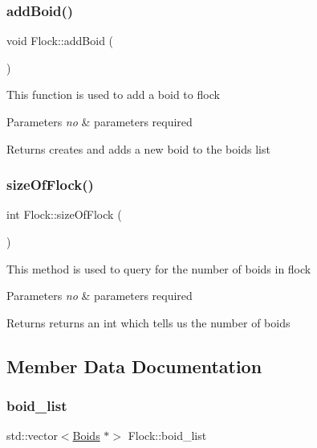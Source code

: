 \subsubsection{\texorpdfstring{add\+Boid()}{addBoid()}}
{\footnotesize\ttfamily void Flock\+::add\+Boid (\begin{DoxyParamCaption}{ }\end{DoxyParamCaption})}

This function is used to add a boid to flock 
\begin{DoxyParams}{Parameters}
{\em no} & parameters required \\
\hline
\end{DoxyParams}
\begin{DoxyReturn}{Returns}
creates and adds a new boid to the boids list 
\end{DoxyReturn}
\mbox{\label{class_flock_a7d6cbb42cc06cf8d0995f4a9113b79c6}} 
\subsubsection{\texorpdfstring{size\+Of\+Flock()}{sizeOfFlock()}}
{\footnotesize\ttfamily int Flock\+::size\+Of\+Flock (\begin{DoxyParamCaption}{ }\end{DoxyParamCaption})}

This method is used to query for the number of boids in flock 
\begin{DoxyParams}{Parameters}
{\em no} & parameters required \\
\hline
\end{DoxyParams}
\begin{DoxyReturn}{Returns}
returns an int which tells us the number of boids 
\end{DoxyReturn}


\subsection{Member Data Documentation}
\mbox{\label{class_flock_a2a8a301e32d7ba53250c760b0a586fd9}} 
\subsubsection{\texorpdfstring{boid\+\_\+list}{boid\_list}}
{\footnotesize\ttfamily std\+::vector$<$\mbox{\hyperlink{class_boids}{Boids}} $\ast$$>$ Flock\+::boid\+\_\+list}

